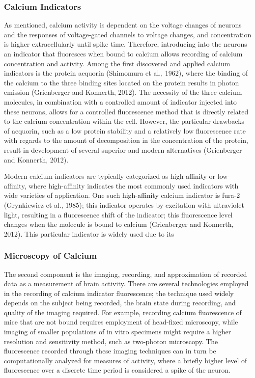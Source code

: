 \documentclass{article}
\begin{document}
\subsubsection{Calcium Indicators}
As mentioned, calcium activity is dependent on the voltage changes of neurons and the responses of voltage-gated channels to voltage changes, and concentration is higher extracellularly until spike time. Therefore, introducing into the neurons an indicator that fluoresces when bound to calcium allows recording of calcium concentration and activity. Among the first discovered and applied calcium indicators is the protein aequorin (Shimomura et al., 1962), where the binding of the calcium to the three binding sites located on the protein results in photon emission (Grienberger and Konnerth, 2012). The necessity of the three calcium molecules, in combination with a controlled amount of indicator injected into these neurons, allows for a controlled fluorescence method that is directly related to the calcium concentration within the cell. However, the particular drawbacks of aequorin, such as a low protein stability and a relatively low fluorescence rate with regards to the amount of decomposition in the concentration of the protein, result in development of several superior and modern alternatives (Grienberger and Konnerth, 2012).\par

Modern calcium indicators are typically categorized as high-affinity or low-affinity, where high-affinity indicates the most commonly used indicators with wide varieties of application. One such high-affinity calcium indicator is fura-2 (Grynkiewicz et al., 1985); this indicator operates by excitation with ultraviolet light, resulting in a fluorescence shift of the indicator; this fluorescence level changes when the molecule is bound to calcium (Grienberger and Konnerth, 2012). This particular indicator is widely used due to its 

\subsubsection{Microscopy of Calcium}
The second component is the imaging, recording, and approximation of recorded data as a measurement of brain activity. There are several technologies employed in the recording of calcium indicator fluorescence; the technique used widely depends on the subject being recorded, the brain state during recording, and quality of the imaging required. For example, recording calcium fluorescence of mice that are not bound requires employment of head-fixed microscopy, while imaging of smaller populations of in vitro specimens might require a higher resolution and sensitivity method, such as two-photon microscopy. The fluorescence recorded through these imaging techniques can in turn be computationally analyzed for measures of activity, where a briefly higher level of fluorescence over a discrete time period is considered a spike of the neuron.\par
\end{document}
